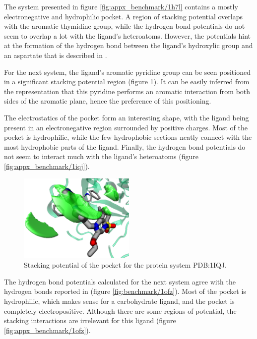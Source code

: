     The system presented in figure \ref{fig:appx_benchmark/1h7l} contains a mostly electronegative and hydrophilic pocket. A region of stacking potential overlaps with the aromatic thymidine group, while the hydrogen bond potentials do not seem to overlap a lot with the ligand's heteroatoms. However, the potentials hint at the formation of the hydrogen bond between the ligand's hydroxylic group and an aspartate that is described in \cite{benchmark_1h7l_2001}.

    For the next system, the ligand's aromatic pyridine group can be seen positioned in a significant stacking potential region (figure \ref{fig:benchmark/1iqj}). It can be easily inferred from the representation that this pyridine performs an aromatic interaction from both sides of the aromatic plane, hence the preference of this positioning.

    The electrostatics of the pocket form an interesting shape, with the ligand being present in an electronegative region surrounded by positive charges. Most of the pocket is hydrophilic, while the few hydrophobic sections neatly connect with the most hydrophobic parts of the ligand. Finally, the hydrogen bond potentials do not seem to interact much with the ligand's heteroatoms (figure \ref{fig:appx_benchmark/1iqj}).

    \begin{figure}[H]
      \centering
      \includegraphics[width=0.5\textwidth]{figures/results/benchmark_prot/1iqj.png}
      \caption{\label{fig:benchmark/1iqj} Stacking potential of the pocket for the protein system PDB:1IQJ.}
    \end{figure}

    The hydrogen bond potentials calculated for the next system agree with the hydrogen bonds reported in \cite{hbonds_2023} (figure \ref{fig:benchmark/1ofz}). Most of the pocket is hydrophilic, which makes sense for a carbohydrate ligand, and the pocket is completely electropositive. Although there are some regions of potential, the stacking interactions are irrelevant for this ligand (figure \ref{fig:appx_benchmark/1ofz}).

